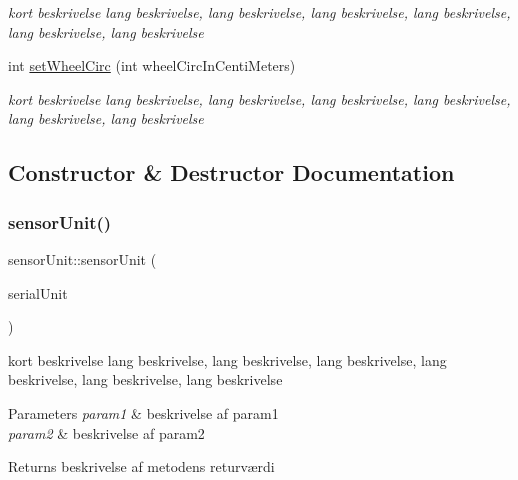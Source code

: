 \begin{DoxyCompactItemize}
\begin{DoxyCompactList}\small\item\em kort beskrivelse lang beskrivelse, lang beskrivelse, lang beskrivelse, lang beskrivelse, lang beskrivelse, lang beskrivelse \end{DoxyCompactList}\item 
int \hyperlink{classsensorUnit_aeb3f83f3e41d1a23974cf9d8537cf3f6}{set\+Wheel\+Circ} (int wheel\+Circ\+In\+Centi\+Meters)
\begin{DoxyCompactList}\small\item\em kort beskrivelse lang beskrivelse, lang beskrivelse, lang beskrivelse, lang beskrivelse, lang beskrivelse, lang beskrivelse \end{DoxyCompactList}\end{DoxyCompactItemize}


\subsection{Constructor \& Destructor Documentation}
\mbox{\label{classsensorUnit_a820a3a2b5353cbb927c109d45c194541}} 
\subsubsection{\texorpdfstring{sensor\+Unit()}{sensorUnit()}}
{\footnotesize\ttfamily sensor\+Unit\+::sensor\+Unit (\begin{DoxyParamCaption}\item[{\hyperlink{classserialUnit}{serial\+Unit} $\ast$}]{serial\+Unit }\end{DoxyParamCaption})}



kort beskrivelse lang beskrivelse, lang beskrivelse, lang beskrivelse, lang beskrivelse, lang beskrivelse, lang beskrivelse 


\begin{DoxyParams}{Parameters}
{\em param1} & beskrivelse af param1 \\
\hline
{\em param2} & beskrivelse af param2 \\
\hline
\end{DoxyParams}
\begin{DoxyReturn}{Returns}
beskrivelse af metodens returværdi 
\end{DoxyReturn}
\mbox{\label{classsensorUnit_a1e606f860650fc1d62af09b7423a299d}} 
